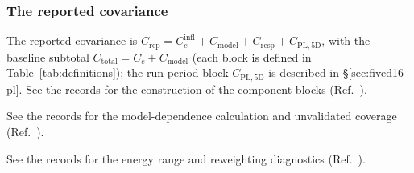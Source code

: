 \subsubsection{The reported covariance}
\label{sec:fived16-cov}
The reported covariance is $C_{\mathrm{rep}}=C_e^{\mathrm{infl}}+C_{\mathrm{model}}+C_{\mathrm{resp}}+C_{\mathrm{PL,5D}}$, with the baseline subtotal $C_{\mathrm{total}}=C_e+C_{\mathrm{model}}$ (each block is defined in Table~\ref{tab:definitions}); the run-period block $C_{\mathrm{PL,5D}}$ is described in \S\ref{sec:fived16-pl}. See the records for the construction of the component blocks (Ref.~\cite{NoteRecords2026}).

See the records for the model-dependence calculation and unvalidated coverage (Ref.~\cite{NoteRecords2026}).

See the records for the energy range and reweighting diagnostics (Ref.~\cite{NoteRecords2026}).


